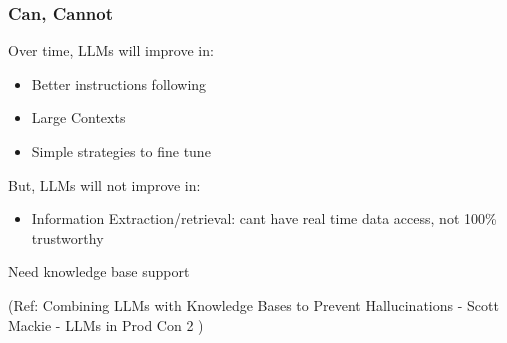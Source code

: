 









\begin{frame}[fragile]\frametitle{Can, Cannot}

Over time, LLMs will improve in:
\begin{itemize}
\item Better instructions following
\item Large Contexts
\item Simple strategies to fine tune
\end{itemize}	

But, LLMs will not improve in:
\begin{itemize}
\item Information Extraction/retrieval: cant have real time data access, not 100\% trustworthy
\end{itemize}

Need knowledge base support

{\tiny (Ref: Combining LLMs with Knowledge Bases to Prevent Hallucinations - Scott Mackie - LLMs in Prod Con 2 )}

\end{frame}






